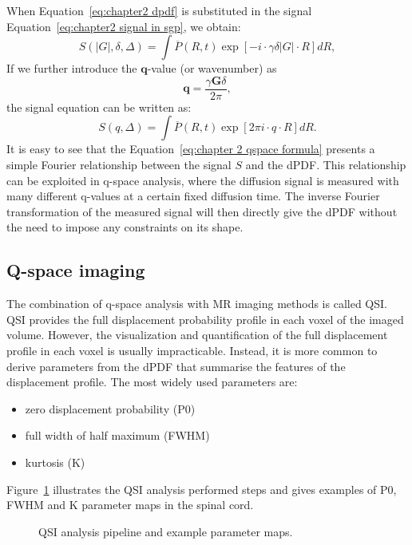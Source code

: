 When Equation~\ref{eq:chapter2 dpdf} is substituted in the signal Equation~\ref{eq:chapter2 signal in sgp}, we obtain:
\begin{equation}
		S(|G|,\delta,\Delta)=\int \overline{P}(R,t) \exp[-i\cdot \gamma \delta |G|\cdot R] dR,
\end{equation}
If we further introduce the $\textbf{q}$-value (or wavenumber) as
 \begin{equation}
\textbf{q}=\frac{\gamma \textbf{G}\delta}{2\pi},
\label{eq: chapter 2 q value definition}
\end{equation}
the signal equation can be written as:
\begin{equation}
		S(q,\Delta)=\int \overline{P}(R,t) \exp[2\pi i \cdot q\cdot R] dR.
\label{eq:chapter 2 qspace formula}
\end{equation}
It is easy to see that the Equation~\ref{eq:chapter 2 qspace formula} presents a simple Fourier relationship between the signal $S$ and the \gls{dPDF}. This relationship can be exploited in q-space analysis, where the diffusion signal is measured with many different q-values at a certain fixed diffusion time. The inverse Fourier transformation of the measured signal will then directly give the \gls{dPDF} without the need to impose any constraints on its shape.

\subsection{Q-space imaging}
\label{sec:qspace}
The combination of q-space analysis with MR imaging methods is called \gls{QSI}\citep{Callaghan:1991,Assaf:2000}. \Gls{QSI} provides the full displacement probability profile in each voxel of the imaged volume. However, the visualization and quantification of the full displacement profile in each voxel is usually impracticable. Instead, it is more common to derive parameters from the \gls{dPDF} that summarise the features of the displacement profile. The most widely used parameters are: 
\begin{itemize}
\item zero displacement probability (P0)
\item full width of half maximum (FWHM)
\item kurtosis (K)
\end{itemize}
Figure~\ref{fig:chapter 2 QSI analysis} illustrates the QSI analysis performed steps and gives examples of P0, FWHM and K parameter maps in the spinal cord.
\begin{figure}[htbp]
 \centering
 \caption{QSI analysis pipeline and example parameter maps.}
 \label{fig:chapter 2 QSI analysis}
\end{figure}
